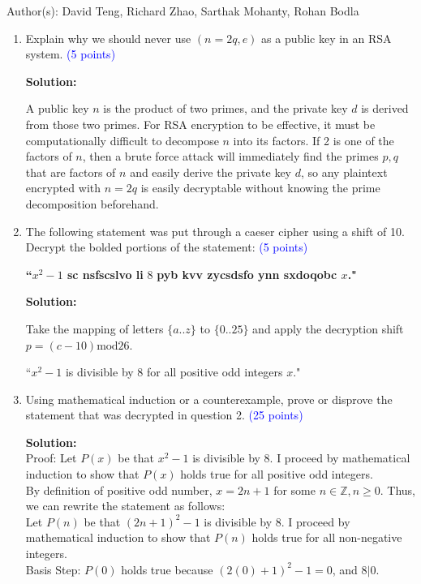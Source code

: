 \documentclass{article}
\newcommand{\pt}[1]{\textcolor{blue}{(#1 points)}}
\newenvironment{solution}
{
\par
\color{blue}
\textbf{Solution:}
}
{
\par
}
\begin{document}
Author(s): David Teng, Richard Zhao, Sarthak Mohanty, Rohan Bodla
\newpage
\begin{enumerate}


\item Explain why we should never use $(n = 2q, e)$ as a public key in an RSA system. \pt{5}
\begin{solution}
A public key $n$ is the product of two primes, and the private key $d$ is derived from those two primes. For RSA encryption to be effective, it must be computationally difficult to decompose $n$ into its factors. If 2 is one of the factors of $n$, then a brute force attack will immediately find the primes $p, q$ that are factors of $n$ and easily derive the private key $d$, so any plaintext encrypted with $n = 2q$ is easily decryptable without knowing the prime decomposition beforehand.
\end{solution}

\item The following statement was put through a caeser cipher using a shift of 10. Decrypt the bolded portions of the statement: \pt{5}\
\begin{center}
    \textbf{``$x^2-1$ sc nsfscslvo li} 8 \textbf{pyb kvv zycsdsfo ynn sxdoqobc $x$."}
\end{center}
\begin{solution}
 Take the mapping of letters $\{a..z\}$ to $\{0..25\}$ and apply the decryption shift $p = (c - 10) \text{mod} 26$.

``$x^2 - 1$ is divisible by 8 for all positive odd integers $x$."
\end{solution}

\item Using mathematical induction or a counterexample, prove or disprove the statement that was decrypted in question 2. \pt{25}
\begin{solution}\\
Proof: Let $P(x)$ be that $x^2 - 1$ is divisible by 8. I proceed by mathematical induction to show that $P(x)$ holds true for all positive odd integers.\\
By definition of positive odd number, $x = 2n + 1$ for some $n \in \mathbb{Z}, n \geq 0$. Thus, we can rewrite the statement as follows:\\
Let $P(n)$ be that $(2n + 1)^2 - 1$ is divisible by 8. I proceed by mathematical induction to show that $P(n)$ holds true for all non-negative integers.\\

Basis Step: $P(0)$ holds true because $(2(0) + 1)^2 - 1 = 0$, and $8 | 0$.


\end{solution}
\end{enumerate}
\end{document}
